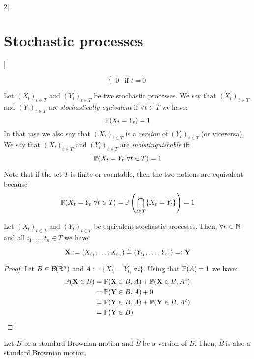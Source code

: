 \documentclass[../../../main_math.tex]{subfiles}
\begin{document}
\begin{multicols}{2}[\section{Stochastic processes}]
\begin{proposition}
\begin{enumerate}
$$\begin{cases}
                0         & \text{if } t=0
              \end{cases}
            $$
    \end{enumerate}
  \end{proposition}
  \begin{definition}
    Let ${(X_t)}_{t\in T}$ and ${(Y_t)}_{t\in T}$ be two stochastic processes. We say that ${(X_t)}_{t\in T}$ and ${(Y_t)}_{t\in T}$ are \emph{stochastically equivalent} if $\forall t\in T$ we have: $$\mathbb{P}(X_t=Y_t)=1$$ In that case we also say that ${(X_t)}_{t\in T}$ is a \emph{version} of ${(Y_t)}_{t\in T}$ (or viceversa). We say that ${(X_t)}_{t\in T}$ and ${(Y_t)}_{t\in T}$ are \emph{indistinguishable} if: $$
      \mathbb{P}(X_t=Y_t\ \forall t\in T)=1
    $$
  \end{definition}
  \begin{remark}
    Note that if the set $T$ is finite or countable, then the two notions are equivalent because:
    $$
      \mathbb{P}(X_t=Y_t\ \forall t\in T)=\mathbb{P}\left(\bigcap_{t\in T} \{X_t=Y_t\}\right)=1
    $$
  \end{remark}
  \begin{proposition}
    Let $({X_t})_{t\in T}$ and $({Y_t})_{t\in T}$ be equivalent stochastic processes. Then, $\forall n\in\mathbb{N}$ and all $t_1,\ldots,t_n\in T$ we have:
    $$
      \boldsymbol{\mathrm{X}}:=(X_{t_1},\ldots,X_{t_n})\overset{\mathrm{d}}{=} (Y_{t_1},\ldots,Y_{t_n})=:\boldsymbol{\mathrm{Y}}
    $$
  \end{proposition}
  \begin{proof}
    Let $B\in\mathcal{B}(\mathbb{R}^n)$ and $A:=\{ X_{t_i} = Y_{t_i}\ \forall i\}$. Using that $\mathbb{P}(A)=1$ we have:
    \begin{align*}
      \mathbb{P}(\boldsymbol{\mathrm{X}}\in B) & =\mathbb{P}(\boldsymbol{\mathrm{X}}\in B, A)+ \mathbb{P}(\boldsymbol{\mathrm{X}}\in B, A^c) \\
                         & =\mathbb{P}(\boldsymbol{\mathrm{Y}}\in B, A)+ 0                       \\
                         & =\mathbb{P}(\boldsymbol{\mathrm{Y}}\in B, A)+ \mathbb{P}(\boldsymbol{\mathrm{Y}}\in B, A^c) \\
                         & =\mathbb{P}(\boldsymbol{\mathrm{Y}}\in B)
    \end{align*}
  \end{proof}
  \begin{corollary}
    Let $B$ be a standard Brownian motion and $\overline{B}$ be a version of $B$. Then, $\overline{B}$ is also a standard Brownian motion.
  \end{corollary}
  \begin{theorem}\label{SP:kolmogorov_continuity}

\end{theorem}
\end{multicols}
\end{document}
